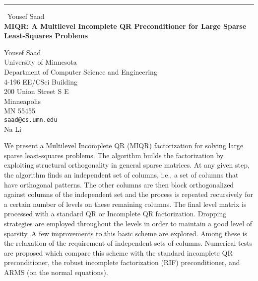 \documentclass{report}
\begin{document}
\begin{center}
\rule{6in}{1pt} \
{\large Yousef Saad \\
{\bf MIQR: A Multilevel Incomplete QR Preconditioner for Large Sparse Least-Squares Problems}}

Yousef Saad \\ University of Minnesota \\ Department of Computer Science and Engineering \\ 4-196 EE/CSci Building \\ 200 Union Street S E \\ Minneapolis \\ MN 55455
\\
{\tt saad@cs.umn.edu}\\
Na Li\end{center}


We present a Multilevel Incomplete QR (MIQR)
factorization for solving large sparse
least-squares problems. The algorithm builds the
factorization by exploiting structural
orthogonality in general sparse matrices. At any
given step, the algorithm finds an independent set
of columns, i.e., a set of columns that have
orthogonal patterns. The other columns are then
block orthogonalized against columns of the
independent set and the process is repeated
recursively for a certain number of levels on
these remaining columns. The final level matrix
is processed with a standard QR or Incomplete QR
factorization. Dropping strategies are employed
throughout the levels in order to maintain a good
level of sparsity. A few improvements to this
basic scheme are explored. Among these is the
relaxation of the requirement of independent sets
of columns. Numerical tests are proposed which
compare this scheme with the standard incomplete
QR preconditioner, the robust incomplete
factorization (RIF) preconditioner, and ARMS (on
the normal equations).
\end{document}
